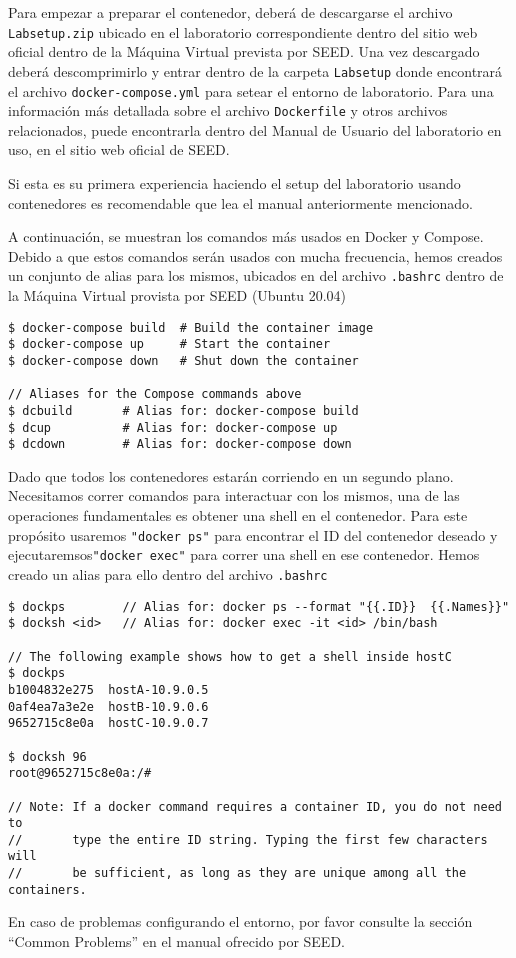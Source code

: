 Para empezar a preparar el contenedor, deberá de descargarse el archivo \texttt{Labsetup.zip} ubicado en el laboratorio correspondiente dentro del sitio web oficial dentro de la Máquina Virtual prevista por SEED. Una vez descargado deberá descomprimirlo y entrar dentro de la carpeta \texttt{Labsetup} donde encontrará el archivo \texttt{docker-compose.yml} para setear el entorno de laboratorio. Para una información más detallada sobre el archivo \texttt{Dockerfile} y otros archivos relacionados, puede encontrarla dentro del Manual de Usuario del laboratorio en uso, en el sitio web oficial de SEED.

Si esta es su primera experiencia haciendo el setup del laboratorio usando contenedores es recomendable que lea el manual anteriormente mencionado.

A continuación, se muestran los comandos más usados en Docker y Compose.
Debido a que estos comandos serán usados con mucha frecuencia, hemos creados un conjunto de alias para los mismos, ubicados en del archivo \texttt{.bashrc} dentro de la Máquina Virtual provista por SEED (Ubuntu 20.04)

\begin{lstlisting}
$ docker-compose build  # Build the container image
$ docker-compose up     # Start the container
$ docker-compose down   # Shut down the container

// Aliases for the Compose commands above
$ dcbuild       # Alias for: docker-compose build
$ dcup          # Alias for: docker-compose up
$ dcdown        # Alias for: docker-compose down
\end{lstlisting}


Dado que todos los contenedores estarán corriendo en un segundo plano. Necesitamos correr comandos para interactuar con los mismos, una de las operaciones fundamentales es obtener una shell en el contenedor. 
Para este propósito usaremos \texttt{"docker ps"} para encontrar el ID del contenedor deseado y ejecutaremsos\texttt{"docker exec"} para correr una shell en ese contenedor.
Hemos creado un alias para ello dentro del archivo \texttt{.bashrc}

\begin{lstlisting}
$ dockps        // Alias for: docker ps --format "{{.ID}}  {{.Names}}" 
$ docksh <id>   // Alias for: docker exec -it <id> /bin/bash

// The following example shows how to get a shell inside hostC
$ dockps
b1004832e275  hostA-10.9.0.5
0af4ea7a3e2e  hostB-10.9.0.6
9652715c8e0a  hostC-10.9.0.7

$ docksh 96
root@9652715c8e0a:/#  

// Note: If a docker command requires a container ID, you do not need to 
//       type the entire ID string. Typing the first few characters will 
//       be sufficient, as long as they are unique among all the containers. 
\end{lstlisting}

En caso de problemas configurando el entorno, por favor consulte la sección ``Common Problems'' en el manual ofrecido por SEED. 

